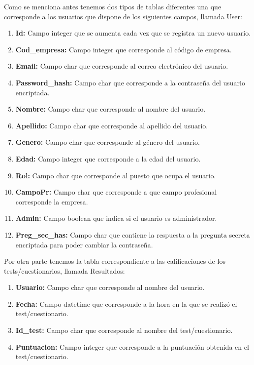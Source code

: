 Como se menciona antes tenemos dos tipos de tablas diferentes una que corresponde a los usuarios que dispone de los siguientes campos, llamada User:
\begin{enumerate}
    \item \textbf{Id:} Campo integer que se aumenta cada vez que se registra un nuevo usuario.
    \item \textbf{Cod\_empresa:} Campo integer que corresponde al código  de empresa.
    \item \textbf{Email:} Campo char que corresponde al correo electrónico del usuario.
    \item \textbf{Password\_hash:} Campo char que corresponde a la contraseña del usuario encriptada.
    \item \textbf{Nombre:} Campo char que corresponde al nombre del usuario.
    \item \textbf{Apellido:} Campo char que corresponde al apellido del usuario.
    \item \textbf{Genero:} Campo char que corresponde al género del usuario.
    \item \textbf{Edad:} Campo integer que corresponde a la edad del usuario.
    \item \textbf{Rol:} Campo char que corresponde al puesto que ocupa el usuario.
    \item \textbf{CampoPr:} Campo char que corresponde a que campo profesional corresponde la empresa.
    \item \textbf{Admin:} Campo boolean que indica si el usuario es administrador.
    \item \textbf{Preg\_sec\_has:} Campo char que contiene la respuesta a la pregunta secreta encriptada para poder cambiar la contraseña.
\end{enumerate}
Por otra parte tenemos la tabla correspondiente a las calificaciones de los tests/cuestionarios, llamada Resultados:
\begin{enumerate}
    \item \textbf{Usuario:} Campo char que corresponde al nombre del usuario.
    \item \textbf{Fecha:} Campo datetime que corresponde a la hora en la que se realizó  el test/cuestionario.
    \item \textbf{Id\_test:} Campo char que corresponde al nombre del test/cuestionario.
    \item \textbf{Puntuacion:} Campo integer que corresponde a la puntuación obtenida en el test/cuestionario.
\end{enumerate}

